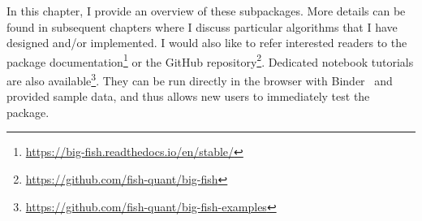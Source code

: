 In this chapter, I provide an overview of these subpackages. More details can be found in subsequent chapters where I discuss particular algorithms that I have designed and/or implemented.
I would also like to refer interested readers to the package documentation\footnote{\url{https://big-fish.readthedocs.io/en/stable/}} or the GitHub repository\footnote{\url{https://github.com/fish-quant/big-fish}}.
Dedicated notebook tutorials are also available\footnote{\url{https://github.com/fish-quant/big-fish-examples}}.
They can be run directly in the browser with Binder~\cite{Jupyter2018Binder2} and provided sample data, and thus allows new users to immediately test the package.

